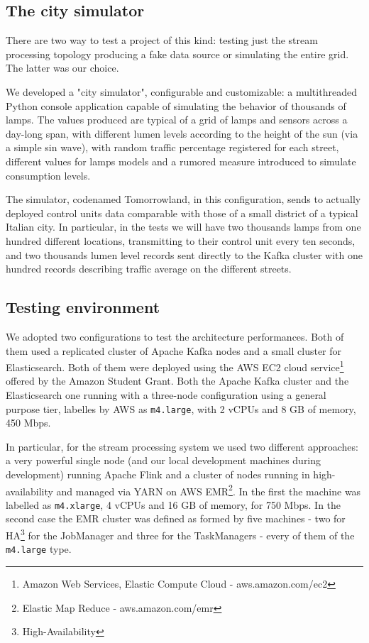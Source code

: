 \subsection{The city simulator}
There are two way to test a project of this kind: testing just the stream processing topology producing a fake data source or simulating the entire grid. The latter was our choice.

We developed a "city simulator", configurable and customizable: a multithreaded Python console application capable of simulating the behavior of thousands of lamps. The values produced are typical of a grid of lamps and sensors across a day-long span, with different lumen levels according to the height of the sun (via a simple sin wave), with random traffic percentage registered for each street, different values for lamps models and a rumored measure introduced to simulate consumption levels.

The simulator, codenamed Tomorrowland, in this configuration, sends to actually deployed control units data comparable with those of a small district of a typical Italian city. In particular, in the tests we will have two thousands lamps from one hundred different locations, transmitting to their control unit every ten seconds, and two thousands lumen level records sent directly to the Kafka cluster with one hundred records describing traffic average on the different streets. 

\subsection{Testing environment}
We adopted two configurations to test the architecture performances. Both of them used a replicated cluster of Apache Kafka nodes and a small cluster for Elasticsearch. Both of them were deployed using the AWS EC2 cloud service\footnote{Amazon Web Services, Elastic Compute Cloud - aws.amazon.com/ec2} offered by the Amazon Student Grant. Both the Apache Kafka cluster and the Elasticsearch one running with a three-node configuration using a general purpose tier, labelles by AWS as \texttt{m4.large}, with 2 vCPUs and 8 GB of memory, 450 Mbps. 

In particular, for the stream processing system we used two different approaches: a very powerful single node (and our local development machines during development) running Apache Flink and a cluster of nodes running in high-availability and managed via YARN on AWS EMR\footnote{Elastic Map Reduce - aws.amazon.com/emr}. In the first the machine was labelled as \texttt{m4.xlarge}, 4 vCPUs and 16 GB of memory, for 750 Mbps. In the second case the EMR cluster was defined as formed by five machines - two for HA\footnote{High-Availability} for the JobManager and three for the TaskManagers -  every of them of the \texttt{m4.large} type.

